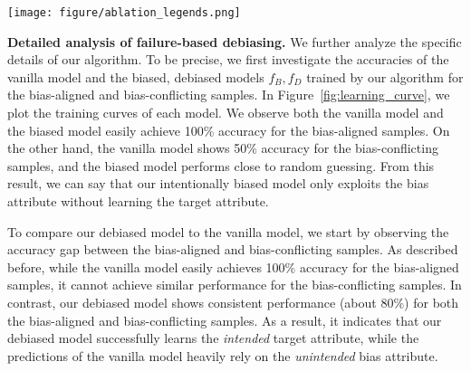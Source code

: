 \begin{figure*}[t!]
    \centering
    \texttt{[image: figure/ablation\_legends.png]}
    \\
    \vspace{-.1in}
    \caption{
    Learning curves of vanilla, biased, and debiased model for Colored MNIST and Corrupted CIFAR-10$^{1}$. For each dataset, the left and the right plots correspond to curves for the bias-aligned samples and the bias-conflicting samples, respectively. }
    \vspace{-.15in}
    \label{fig:learning_curve}
\end{figure*}   

 
\textbf{Detailed analysis of failure-based debiasing.}
We further analyze the specific details of our algorithm. To be precise, we first investigate the accuracies of the vanilla model and the biased, debiased models $f_{B}, f_{D}$ trained by our algorithm for the bias-aligned and bias-conflicting samples. In Figure~\ref{fig:learning_curve}, we plot the training curves of each model. We observe both the vanilla model and the biased model easily achieve 100\% accuracy for the bias-aligned samples. On the other hand, the vanilla model shows 50\% accuracy for the bias-conflicting samples, and the biased model performs close to random guessing. From this result, we can say that our intentionally biased model only exploits the bias attribute without learning the target attribute. 

To compare our debiased model to the vanilla model, we start by observing the accuracy gap between the bias-aligned and bias-conflicting samples. As described before, while the vanilla model easily achieves 100\% accuracy for the bias-aligned samples, it cannot achieve similar performance for the bias-conflicting samples. In contrast, our debiased model shows consistent performance (about 80\%) for both the bias-aligned and bias-conflicting samples. As a result, it indicates that our debiased model successfully learns the \textit{intended} target attribute, while the predictions of the vanilla model heavily rely on the \textit{unintended} bias attribute.

